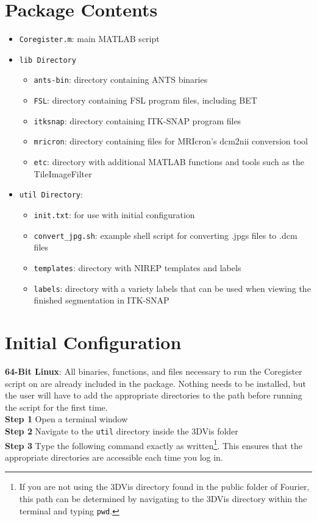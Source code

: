 \documentclass[12pt]{article}
\begin{document}
\section{Package Contents}
\begin{itemize}
\renewcommand{\labelitemii}{$\circ$}
\item \texttt{Coregister.m}: main MATLAB script 
\item \texttt{lib Directory}
	\begin{itemize}
	\item{\texttt{ants-bin}: directory containing ANTS binaries}
	\item{\texttt{FSL}: directory containing FSL program files, including BET}
	\item{\texttt{itksnap}: directory containing ITK-SNAP program files}
	\item{\texttt{mricron}: directory containing files for MRIcron's dcm2nii conversion tool}
	\item{\texttt{etc}}: directory with additional MATLAB functions and tools such as the TileImageFilter
	\end{itemize}
\item \texttt{util Directory}: 
	\begin{itemize}
	\item \texttt{init.txt}: for use with initial configuration
	\item \texttt{convert\_jpg.sh}: example shell script for converting .jpgs files to .dcm files
	\item \texttt{templates}: directory with NIREP templates and labels
	\item \texttt{labels}: directory with a variety labels that can be used when viewing the finished segmentation in ITK-SNAP
	\end{itemize}

\end{itemize}


\section{Initial Configuration}
\label{sec: initial config}
\textbf{64-Bit Linux}: All binaries, functions, and files necessary to run the Coregister script on are already included in the package. Nothing needs to be installed, but the user will have to add the appropriate directories to the path before running the script for the first time. \\
\textbf{Step 1} Open a terminal window\\
\textbf{Step 2} Navigate to the \texttt{util} directory inside the 3DVis folder\\
\textbf{Step 3} Type the following command exactly as written\footnote{If you are not using the 3DVis directory found in the public folder of Fourier, this path can be determined by navigating to the 3DVis directory within the terminal and typing \texttt{pwd}.}. This ensures that the appropriate directories are accessible each time you log in.
\end{document}
